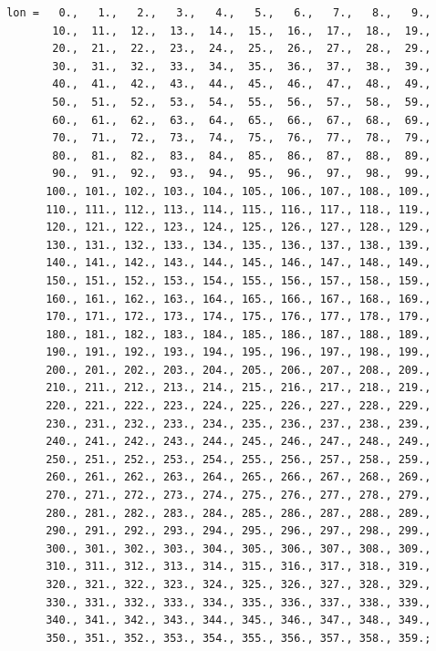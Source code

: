 \documentclass[times,doublespace]{fldauth}
\begin{document}
{\begin{appendix}
\begin{verbatim}
 lon =   0.,   1.,   2.,   3.,   4.,   5.,   6.,   7.,   8.,   9., 
        10.,  11.,  12.,  13.,  14.,  15.,  16.,  17.,  18.,  19., 
        20.,  21.,  22.,  23.,  24.,  25.,  26.,  27.,  28.,  29., 
        30.,  31.,  32.,  33.,  34.,  35.,  36.,  37.,  38.,  39., 
        40.,  41.,  42.,  43.,  44.,  45.,  46.,  47.,  48.,  49., 
        50.,  51.,  52.,  53.,  54.,  55.,  56.,  57.,  58.,  59., 
        60.,  61.,  62.,  63.,  64.,  65.,  66.,  67.,  68.,  69., 
        70.,  71.,  72.,  73.,  74.,  75.,  76.,  77.,  78.,  79., 
        80.,  81.,  82.,  83.,  84.,  85.,  86.,  87.,  88.,  89., 
        90.,  91.,  92.,  93.,  94.,  95.,  96.,  97.,  98.,  99., 
       100., 101., 102., 103., 104., 105., 106., 107., 108., 109., 
       110., 111., 112., 113., 114., 115., 116., 117., 118., 119., 
       120., 121., 122., 123., 124., 125., 126., 127., 128., 129., 
       130., 131., 132., 133., 134., 135., 136., 137., 138., 139., 
       140., 141., 142., 143., 144., 145., 146., 147., 148., 149., 
       150., 151., 152., 153., 154., 155., 156., 157., 158., 159., 
       160., 161., 162., 163., 164., 165., 166., 167., 168., 169., 
       170., 171., 172., 173., 174., 175., 176., 177., 178., 179., 
       180., 181., 182., 183., 184., 185., 186., 187., 188., 189., 
       190., 191., 192., 193., 194., 195., 196., 197., 198., 199., 
       200., 201., 202., 203., 204., 205., 206., 207., 208., 209., 
       210., 211., 212., 213., 214., 215., 216., 217., 218., 219., 
       220., 221., 222., 223., 224., 225., 226., 227., 228., 229., 
       230., 231., 232., 233., 234., 235., 236., 237., 238., 239., 
       240., 241., 242., 243., 244., 245., 246., 247., 248., 249., 
       250., 251., 252., 253., 254., 255., 256., 257., 258., 259., 
       260., 261., 262., 263., 264., 265., 266., 267., 268., 269., 
       270., 271., 272., 273., 274., 275., 276., 277., 278., 279., 
       280., 281., 282., 283., 284., 285., 286., 287., 288., 289., 
       290., 291., 292., 293., 294., 295., 296., 297., 298., 299., 
       300., 301., 302., 303., 304., 305., 306., 307., 308., 309., 
       310., 311., 312., 313., 314., 315., 316., 317., 318., 319., 
       320., 321., 322., 323., 324., 325., 326., 327., 328., 329., 
       330., 331., 332., 333., 334., 335., 336., 337., 338., 339., 
       340., 341., 342., 343., 344., 345., 346., 347., 348., 349., 
       350., 351., 352., 353., 354., 355., 356., 357., 358., 359.;
       

\end{verbatim}
\end{appendix}}
\end{document}
